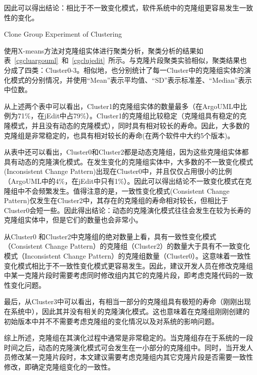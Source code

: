 因此可以得出结论：相比于不一致变化模式，软件系统中的克隆组更容易发生一致性的变化。

{Clone Group Experiment of Clustering} 

使用X-means方法对克隆组实体进行聚类分析，聚类分析的结果如表~\ref{cgcluargouml}~和~\ref{cgclujedit}~所示。与克隆片段聚类实验相似，聚类结果也分成了四类：Cluster0-3。相似地，也分别统计了每一Cluster中的克隆组实体的演化模式的分别情况，并使用“Mean”表示平均值、“SD”表示标准差、“Median”表示中位数。

从上述两个表中可以看出，Cluster1的克隆组实体的数量最多（在ArgoUML中比例为71\%，在jEdit中占79\%）。Cluster1的克隆组比较稳定（克隆组具有稳定的克隆模式，并且没有动态的克隆模式），同时具有相对较长的寿命。因此，大多数的克隆组是非常稳定的，也具有相对较长的寿命(在两个软件中大约5个版本)。

从表中还可以看出，Cluster0和Cluster2都是动态克隆组，因为这些克隆组实体都具有动态的克隆演化模式。在发生变化的克隆组实体中，大多数的不一致变化模式(Inconsistent Change Pattern)出现在Cluster0中，并且仅仅占用很小的比例（ArgoUML中的4\%，在jEdit中只有1\%）。因此可以得出结论不一致变化模式在克隆组中不会频繁发生。值得注意的是，一致性变化模式(Consistent Change Pattern)仅发生在Cluster2中，其存在的克隆组的寿命相对较长，但相比于Cluster0会短一些。因此得出结论：动态的克隆演化模式往往会发生在较为长寿的克隆组实体中，但是它们的数量也会非常小。

从Cluster0 和Cluster2中克隆组的绝对数量上看，具有一致性变化模式（Consistent Change Pattern）的克隆组（Cluster2）的数量大于具有不一致变化模式（Inconsistent Change Pattern）的克隆组数量（Cluster0）。这意味着一致性变化模式相比于不一致性变化模式更容易发生。因此，建议开发人员在修改克隆组中某一克隆片段时需要考虑同时修改组内其它的克隆片段，即考虑克隆代码的一致性变化问题。

最后，从Cluster3中可以看出，有相当一部分的克隆组具有极短的寿命（刚刚出现在系统中），因此其并没有相关的克隆演化模式。这也意味着在克隆组刚刚创建的初始版本中并不不需要考虑克隆组的变化情况以及对系统的影响问题。

综上所述，克隆组在其演化过程中通常是非常稳定的。当克隆组存在于系统的一段时间之后，动态的克隆演化模式可会发生在一小部分的克隆组中。同时，当开发人员修改某一克隆片段时，本文建议需要考虑克隆组内其它克隆片段是否需要一致性修改，即确定克隆组变化的一致性。

